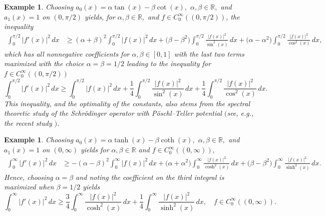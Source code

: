\documentclass[reqno,10pt,centertags]{amsart}
\newcommand{\bbR}{{\mathbb{R}}}
\renewcommand{\a}{\alpha}
\renewcommand{\b}{\beta}
\numberwithin{equation}{section}
\newtheorem{example}[theorem]{Example}
\theoremstyle{remark}
\begin{document}
\begin{example}
Choosing $a_0(x)=\a\tan(x)-\beta\cot(x),$ $\a,\b\in\bbR,$ and $a_1(x)=1$ on $(0,\pi/2)$ yields, for $\a,\b\in\bbR,$ and $f\in C^\infty_0((0,\pi/2))$, the inequality
\begin{align}
\int_{0}^{\pi/2} |f'(x)|^2\, dx &\geq (\a+\b)^2\int_{0}^{\pi/2} |f(x)|^2\, dx + \big(\b-\b^2\big)\int_{0}^{\pi/2} \frac{|f(x)|^2}{\sin^2(x)}\, dx+ \big(\a-\a^2\big)\int_{0}^{\pi/2} \frac{|f(x)|^2}{\cos^2(x)}\, dx,
\end{align}
which has all nonnegative coefficients for $\a,\b\in[0,1]$ with the last two terms maximized with the choice $\a=\b=1/2$ leading to the inequality for $f\in C^\infty_0((0,\pi/2))$
\begin{equation}
\int_{0}^{\pi/2} |f'(x)|^2\, dx \geq \int_{0}^{\pi/2} |f(x)|^2\, dx + \frac{1}{4}\int_{0}^{\pi/2} \frac{|f(x)|^2}{\sin^2(x)}\, dx+ \frac{1}{4}\int_{0}^{\pi/2} \frac{|f(x)|^2}{\cos^2(x)}\, dx .
\end{equation}
This inequality, and the optimality of the constants, also stems from the spectral theoretic study of the Schr\"odinger operator with P\"oschl--Teller potential $($see, e.g., the recent study \cite{FS25a}$)$.
\end{example}

\begin{example}
Choosing $a_0(x)=\a\tanh(x)-\b\coth(x),$ $\a,\b\in\bbR,$ and $a_1(x)=1$ on $(0,\infty)$ yields for $\a,\b\in\bbR$ and $f\in C^\infty_0((0,\infty)),$
\begin{align}
\int_{0}^{\infty} |f'(x)|^2\, dx &\geq -(\a-\b)^2\int_{0}^{\infty} |f(x)|^2\, dx + \big(\a+\a^2\big)\int_{0}^{\infty} \frac{|f(x)|^2}{\cosh^2(x)}\, dx + \big(\b-\b^2\big)\int_{0}^{\infty} \frac{|f(x)|^2}{\sinh^2(x)}\, dx.
\end{align}
Hence, choosing $\a=\b$ and noting the coefficient on the third integral is maximized when $\b=1/2$ yields
\begin{equation}\label{eq:trighardylast}
\int_{0}^{\infty} |f'(x)|^2\, dx \geq \frac{3}{4}\int_{0}^{\infty} \frac{|f(x)|^2}{\cosh^2(x)}\, dx + \frac{1}{4}\int_{0}^{\infty} \frac{|f(x)|^2}{\sinh^2(x)}\, dx,\quad f\in C^\infty_0((0,\infty)).
\end{equation}
\end{example}
\end{document}
